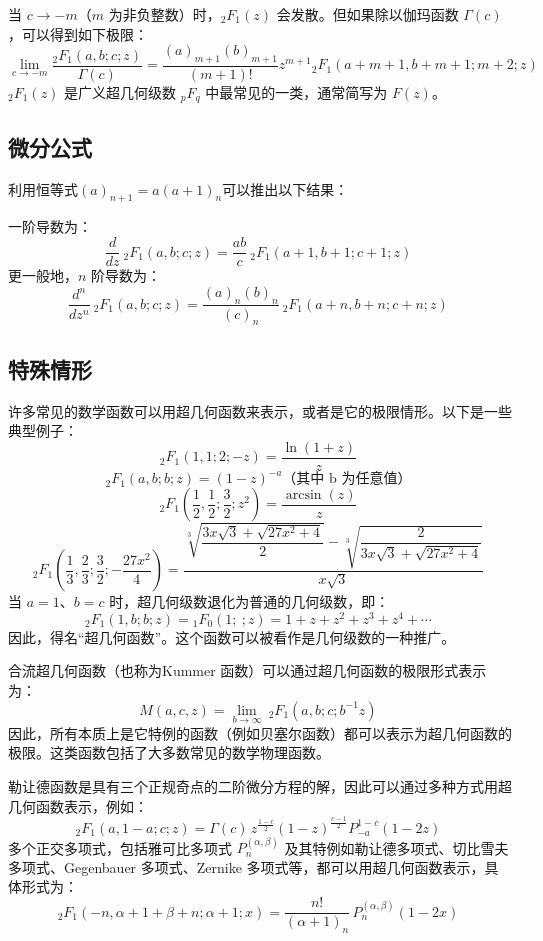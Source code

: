 当 $c \to -m$（$m$ 为非负整数）时，${}_2F_1(z)$ 会发散。但如果除以伽玛函数 $\Gamma(c)$，可以得到如下极限：
$$
\lim_{c \to -m} \frac{{}_2F_1(a, b; c; z)}{\Gamma(c)} = \frac{(a)_{m+1} (b)_{m+1}}{(m+1)!} z^{m+1} {}_2F_1(a + m + 1, b + m + 1; m + 2; z)~
$$
${}_2F_1(z)$ 是广义超几何级数 ${}_pF_q$ 中最常见的一类，通常简写为 $F(z)$。
\subsection{微分公式}
利用恒等式$(a)_{n+1} = a(a+1)_n$可以推出以下结果：

一阶导数为：
$$
\frac{d}{dz} \ {}_2F_1(a, b; c; z) = \frac{ab}{c} \ {}_2F_1(a+1, b+1; c+1; z)~
$$
更一般地，$n$ 阶导数为：
$$
\frac{d^n}{dz^n} \ {}_2F_1(a, b; c; z) = \frac{(a)_n (b)_n}{(c)_n} \ {}_2F_1(a+n, b+n; c+n; z)~
$$
\subsection{特殊情形}
许多常见的数学函数可以用超几何函数来表示，或者是它的极限情形。以下是一些典型例子：
$$
{}_2F_1(1, 1; 2; -z) = \frac{\ln(1 + z)}{z}~
$$
$$
{}_2F_1(a, b; b; z) = (1 - z)^{-a}\text{（其中 b 为任意值）}~
$$
$$
{}_2F_1\left(\frac{1}{2}, \frac{1}{2}; \frac{3}{2}; z^2\right) = \frac{\arcsin(z)}{z}~
$$
$$
{}_2F_1\left(\frac{1}{3}, \frac{2}{3}; \frac{3}{2}; -\frac{27x^2}{4} \right) = \frac{
\sqrt[3]{\dfrac{3x\sqrt{3} + \sqrt{27x^2 + 4}}{2}} - \sqrt[3]{\dfrac{2}{3x\sqrt{3} + \sqrt{27x^2 + 4}}}
}{x\sqrt{3}}~
$$
当 $a = 1$、$b = c$ 时，超几何级数退化为普通的几何级数，即：
$$
{}_2F_1(1, b; b; z) = {}_1F_0(1;\ ;z) = 1 + z + z^2 + z^3 + z^4 + \cdots~
$$
因此，得名“超几何函数”。这个函数可以被看作是几何级数的一种推广。

合流超几何函数（也称为Kummer 函数）可以通过超几何函数的极限形式表示为：
$$
M(a, c, z) = \lim_{b \to \infty} \ {}_2F_1\left(a, b; c; b^{-1}z\right)~
$$
因此，所有本质上是它特例的函数（例如贝塞尔函数）都可以表示为超几何函数的极限。这类函数包括了大多数常见的数学物理函数。

勒让德函数是具有三个正规奇点的二阶微分方程的解，因此可以通过多种方式用超几何函数表示，例如：
$$
{}_2F_1(a, 1 - a; c; z) = \Gamma(c) \, z^{\frac{1 - c}{2}} (1 - z)^{\frac{c - 1}{2}} P_{-a}^{1 - c}(1 - 2z)~
$$
多个正交多项式，包括雅可比多项式 $P_n^{(\alpha, \beta)}$ 及其特例如勒让德多项式、切比雪夫多项式、Gegenbauer 多项式、Zernike 多项式等，都可以用超几何函数表示，具体形式为：
$$
{}_2F_1(-n, \alpha + 1 + \beta + n; \alpha + 1; x) = \frac{n!}{(\alpha + 1)_n} \, P_n^{(\alpha, \beta)}(1 - 2x)~
$$

